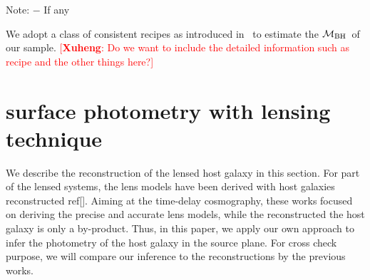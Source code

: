 \documentclass[fleqn,usenatbib]{mnras}
\newcommand{\mbh}{$\mathcal M_{\rm BH}$}
\newcommand{\ding}[1]{\textcolor{red}{[{\bf Xuheng}: #1]}}
\begin{document}
\begin{table}
\centering
\caption{Summary of lensed AGN information.}\label{data_set}
\begin{tablenotes}
      \small
      \item Note: $-$ If any
\end{tablenotes}  
\end{table}

We adopt a class of consistent recipes as introduced in~\citet{Ding2020} to estimate the \mbh\ of our sample. \ding{Do we want to include the detailed information such as recipe and the other things here?}

\section{surface photometry with lensing technique}
We describe the reconstruction of the lensed host galaxy in this section. For part of the lensed systems, the lens models have been derived with host galaxies reconstructed ref[]. Aiming at the time-delay cosmography, these works focused on deriving the precise and accurate lens models, while the reconstructed the host galaxy is only a by-product. Thus, in this paper, we apply our own approach to infer the photometry of the host galaxy in the source plane. For cross check purpose, we will compare our inference to the reconstructions by the previous works.
\end{document}
